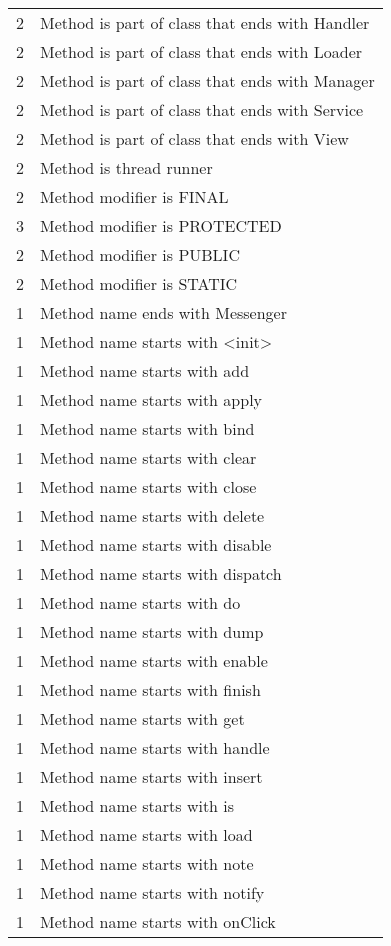 \begin{center}
\begin{longtable}{l|l}
    2 & Method is part of class that ends with Handler \\
    2 & Method is part of class that ends with Loader \\
    2 & Method is part of class that ends with Manager \\
    2 & Method is part of class that ends with Service \\
    2 & Method is part of class that ends with View \\
    2 & Method is thread runner \\
    2 & Method modifier is FINAL \\
    3 & Method modifier is PROTECTED \\
    2 & Method modifier is PUBLIC \\
    2 & Method modifier is STATIC \\
    1 & Method name ends with Messenger \\
    1 & Method name starts with <init> \\
    1 & Method name starts with add \\
    1 & Method name starts with apply \\
    1 & Method name starts with bind \\
    1 & Method name starts with clear \\
    1 & Method name starts with close \\
    1 & Method name starts with delete \\
    1 & Method name starts with disable \\
    1 & Method name starts with dispatch \\
    1 & Method name starts with do \\
    1 & Method name starts with dump \\
    1 & Method name starts with enable \\
    1 & Method name starts with finish \\
    1 & Method name starts with get \\
    1 & Method name starts with handle \\
    1 & Method name starts with insert \\
    1 & Method name starts with is \\
    1 & Method name starts with load \\
    1 & Method name starts with note \\
    1 & Method name starts with notify \\
    1 & Method name starts with onClick \\

\end{longtable}
\end{center}
